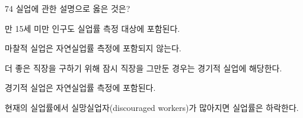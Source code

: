\begin{question}{74}
실업에 관한 설명으로 옳은 것은?
\begin{choices}
  \item 만 15세 미만 인구도 실업률 측정 대상에 포함된다.
  \item 마찰적 실업은 자연실업률 측정에 포함되지 않는다.
  \item 더 좋은 직장을 구하기 위해 잠시 직장을 그만둔 경우는 경기적 실업에 해당한다.
  \item 경기적 실업은 자연실업률 측정에 포함된다.
  \item 현재의 실업률에서 실망실업자(discouraged workers)가 많아지면 실업률은 하락한다.
\end{choices}
\end{question}
